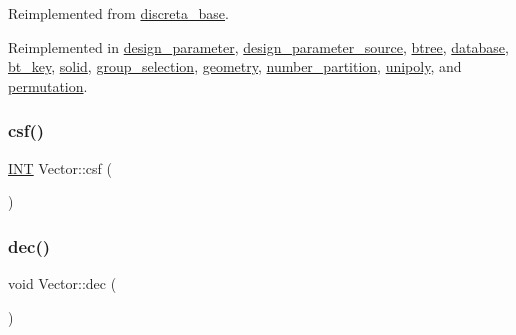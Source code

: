 Reimplemented from \mbox{\hyperlink{classdiscreta__base_a33180628d9ced231267229b3564790f3}{discreta\+\_\+base}}.



Reimplemented in \mbox{\hyperlink{classdesign__parameter_a4e0434c6fd0d805543d730b40fc8e01f}{design\+\_\+parameter}}, \mbox{\hyperlink{classdesign__parameter__source_a1fd0910addc02ffe117ec08d0f93f8a6}{design\+\_\+parameter\+\_\+source}}, \mbox{\hyperlink{classbtree_ae990f68198985c1c7c7a36a65f091ac7}{btree}}, \mbox{\hyperlink{classdatabase_a7402d11485a917293586dcf082f506b2}{database}}, \mbox{\hyperlink{classbt__key_ae97899364f826bc3d16cce36b9c8e4f7}{bt\+\_\+key}}, \mbox{\hyperlink{classsolid_a7f35a904885ef626d1a74663fe2cad62}{solid}}, \mbox{\hyperlink{classgroup__selection_a02a5e69978de662af0e8372a4f0b23a8}{group\+\_\+selection}}, \mbox{\hyperlink{classgeometry_a3c35255b73911b76347ae549edfb0050}{geometry}}, \mbox{\hyperlink{classnumber__partition_acf25157ca8486f55d86d7ea05fa033be}{number\+\_\+partition}}, \mbox{\hyperlink{classunipoly_aa856d320a499748a0f3345ab45e51910}{unipoly}}, and \mbox{\hyperlink{classpermutation_aed08e7ec26ec8ba0ed8c656a819ce43a}{permutation}}.

\mbox{\label{class_vector_a7bbfe1d599a93f58b2150a026a27b0f4}} 
\subsubsection{\texorpdfstring{csf()}{csf()}}
{\footnotesize\ttfamily \mbox{\hyperlink{galois_8h_a09fddde158a3a20bd2dcadb609de11dc}{I\+NT}} Vector\+::csf (\begin{DoxyParamCaption}{ }\end{DoxyParamCaption})}

\mbox{\label{class_vector_ac2c2f8a845000951b008bbe833be3fd4}} 
\subsubsection{\texorpdfstring{dec()}{dec()}}
{\footnotesize\ttfamily void Vector\+::dec (\begin{DoxyParamCaption}{ }\end{DoxyParamCaption})\hspace{0.3cm}{\ttfamily [virtual]}}



